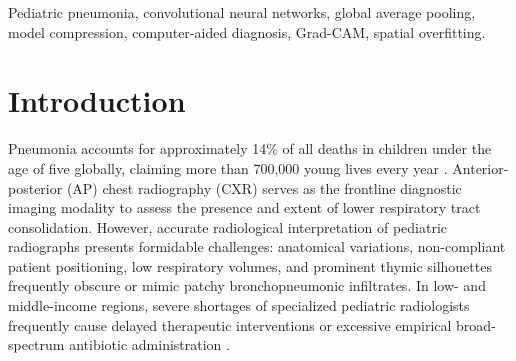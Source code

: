 \documentclass[conference]{IEEEtran}
\begin{document}
\begin{abstract}
Pediatric pneumonia remains the single largest infectious cause of childhood mortality worldwide. While deep convolutional neural networks (CNNs) have shown strong capability in computer-aided chest radiography diagnosis, conventional scratch-trained models frequently exhibit severe over-parameterization within their fully connected classification heads. This parameter bloat fosters position-dependent spatial overfitting, where the network memorizes non-pathological edge coordinates rather than genuine pulmonary consolidations. In this study, we first reproduce the foundational baseline architecture of Stephen et al. (2019) on the Kermany pediatric cohort (5,856 radiographs), achieving 93.77\% validation accuracy on a stratified 3,722 training / 2,134 validation split. We identify that 9,438,209 out of 9,679,041 parameters (97.51\%) reside inside a single Dense(512) layer. To resolve this bottleneck, we formulate and empirically evaluate a controlled architectural hypothesis: replacing the Flatten and Dense(512) head with Global Average Pooling (GAP) while holding the 4-stage convolutional backbone identical. Our empirical findings demonstrate that GAP reduces total trainable parameters by 97.51\% (down to 240,961) and compresses disk footprint 40-fold from 36.92~MB to 0.92~MB. Concurrently, validation accuracy improves to 95.55\% (+1.78\%), validation F1-score increases to 0.9698, and diagnostic sensitivity rises to 98.01\%, reducing critical false-negative missed cases by 34.0\%. Furthermore, Gradient-weighted Class Activation Mapping (Grad-CAM) confirms that GAP enforces clinically trustworthy attention tightly focused over pulmonary opacities.
\end{abstract}

\begin{IEEEkeywords}
Pediatric pneumonia, convolutional neural networks, global average pooling, model compression, computer-aided diagnosis, Grad-CAM, spatial overfitting.
\end{IEEEkeywords}

\section{Introduction}
Pneumonia accounts for approximately 14\% of all deaths in children under the age of five globally, claiming more than 700,000 young lives every year \cite{b_who}. Anterior-posterior (AP) chest radiography (CXR) serves as the frontline diagnostic imaging modality to assess the presence and extent of lower respiratory tract consolidation. However, accurate radiological interpretation of pediatric radiographs presents formidable challenges: anatomical variations, non-compliant patient positioning, low respiratory volumes, and prominent thymic silhouettes frequently obscure or mimic patchy bronchopneumonic infiltrates. In low- and middle-income regions, severe shortages of specialized pediatric radiologists frequently cause delayed therapeutic interventions or excessive empirical broad-spectrum antibiotic administration \cite{b_kermany}.
\end{document}
